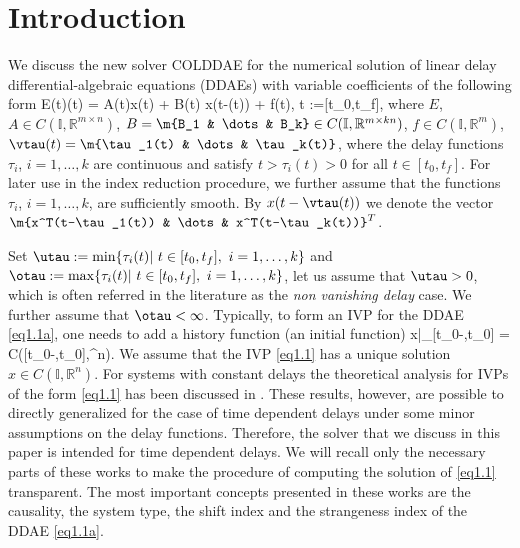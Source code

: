 \documentclass[final,reqno]{siamltex}
\begin{document}
\section{Introduction}
We discuss the new solver COLDDAE for the numerical solution of linear delay differential-algebraic equations (DDAEs) with variable coefficients of the following form
%
\bsq\label{eq1.1}
\be\label{eq1.1a}
 E(t)(t) = A(t)x(t) + B(t) x(t-\vtau(t)) + f(t), \quad t\in {} :=[t_0,t_f],
\ee
%
where $E$, $A \in C(\mathbb{I},\mathbb{R}^{m\times n})$, $B = \m{B_1 & \dots & B_k} \in C(\mathbb{I},\mathbb{R}^{m\times kn})$, 
$f\in C(\mathbb{I},\mathbb{R}^{m})$, $\vtau(t) = \m{\tau_1(t) & \dots & \tau_k(t)}$, 
where the delay functions $\tau_i$, $i=1,\dots,k$ are continuous and satisfy $t > \tau_i(t) > 0$ for all 
$t\in [t_0,t_f]$. For later use in the index reduction procedure, we further assume that the functions 
$\tau_i$, $i=1,\dots,k$, are sufficiently smooth. By $x(t-\vtau(t))$ we denote the vector $\m{x^T(t-\tau_1(t)) & \dots & x^T(t-\tau_k(t))}^T$.

Set $\utau := \min \{\tau_i(t)| \ t\in [t_0,t_f], \ i=1,\dots,k \}$ and $\otau := \max \{\tau_i(t)| \ t\in [t_0,t_f], \ i=1,\dots,k \}$, 
let us assume that $\utau >0$, which is often referred in the literature \cite{BelC63,BakPT02} as the \emph{non vanishing delay} case. 
We further assume that $\otau < \infty$. Typically, to form an IVP for the DDAE \eqref{eq1.1a}, one needs to add a history function (an initial function) 
%
\be
 x|_{[t_0-\otau,t_0]} = \phi \in C([t_0-\otau,t_0],\R^n).
\ee
%
\esq
%
We assume that the IVP \eqref{eq1.1} has a unique solution $x\in C(\mathbb{I},\mathbb{R}^n)$. For systems with constant delays 
the theoretical analysis for IVPs of the form \eqref{eq1.1} has been discussed in \cite{HaMS14,HaM14,Ha15}. These results, however, 
are possible to directly generalized for the case of time dependent delays under some minor assumptions on the delay functions. Therefore, the solver 
that we discuss in this paper is intended for time dependent delays. 
We will recall only the necessary parts of these works to make the procedure of computing the solution of \eqref{eq1.1} transparent.
The most important concepts presented in these works are the causality, the system type, the shift index and the strangeness index of the DDAE \eqref{eq1.1a}.
\end{document}

